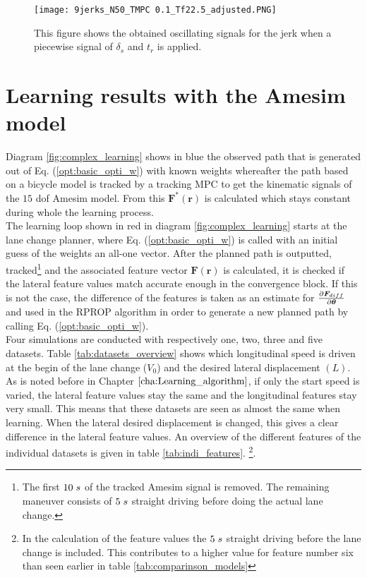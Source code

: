 \begin{figure}[h!]
	\centering
	\texttt{[image: 9jerks\_N50\_TMPC 0.1\_Tf22.5\_adjusted.PNG]}
	\caption{This figure shows the obtained oscillating signals for the jerk when a piecewise signal of $\delta_s$ and $t_r$ is applied.}	
	\label{fig:old_inputs}
\end{figure}

\section{Learning results with the Amesim model}
\label{s:complex_learning_results}
Diagram \ref{fig:complex_learning} shows in blue the observed path that is generated out of Eq. (\ref{opt:basic_opti_w}) with known weights whereafter the path based on a bicycle model is tracked by a tracking MPC to get the kinematic signals of the $15$ dof Amesim model. From this $\bm{F}^*(\bm{r})$ is calculated which stays constant during whole the learning process.\\

The learning loop shown in red in diagram \ref{fig:complex_learning} starts at the lane change planner, where Eq. (\ref{opt:basic_opti_w}) is called with an initial guess of the weights an all-one vector. After the planned path is outputted, tracked\footnote{The first $10 \hspace{1mm}s$ of the tracked Amesim signal is removed. The remaining maneuver consists of $5 \hspace{1mm}s$ straight driving before doing the actual lane change.} and the associated feature vector $\bm{F}(\bm{r})$ is calculated, it is checked if the lateral feature values match accurate enough in the convergence block. If this is not the case, the difference of the features is taken as an estimate for $\pdv{\bm{F}_{diff}}{\bm{\theta}}$ and used in the RPROP algorithm in order to generate a new planned path by calling Eq. (\ref{opt:basic_opti_w}). \\

Four simulations are conducted with respectively one, two, three and five datasets. Table \ref{tab:datasets_overview} shows which longitudinal speed is driven at the begin of the lane change ($V_{0}$) and the desired lateral displacement $(L)$. As is noted before in Chapter $\ref{cha:Learning_algorithm}$, if only the start speed is varied, the lateral feature values stay the same and the longitudinal features stay very small. This means that these datasets are seen as almost the same when learning. When the lateral desired displacement is changed, this gives a clear difference in the lateral feature values. An overview of the different features of the individual datasets is given in table \ref{tab:indi_features}. \footnote{In the calculation of the feature values the $5 \hspace{1mm}s$ straight driving before the lane change is included. This contributes to a higher value for feature number six than seen earlier in table \ref{tab:comparinson_models}}.



